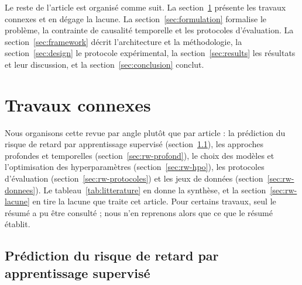 \documentclass[11pt,a4paper]{article}
\theoremstyle{definition}
\begin{document}
Le reste de l'article est organisé comme suit. La section~\ref{sec:relwork} présente les travaux connexes et en dégage la lacune. La section~\ref{sec:formulation} formalise le problème, la contrainte de causalité temporelle et les protocoles d'évaluation. La section~\ref{sec:framework} décrit l'architecture et la méthodologie, la section~\ref{sec:design} le protocole expérimental, la section~\ref{sec:results} les résultats et leur discussion, et la section~\ref{sec:conclusion} conclut.

\section{Travaux connexes}
\label{sec:relwork}

Nous organisons cette revue par angle plutôt que par article : la prédiction du risque de retard par apprentissage supervisé (section~\ref{sec:rw-supervise}), les approches profondes et temporelles (section~\ref{sec:rw-profond}), le choix des modèles et l'optimisation des hyperparamètres (section~\ref{sec:rw-hpo}), les protocoles d'évaluation (section~\ref{sec:rw-protocoles}) et les jeux de données (section~\ref{sec:rw-donnees}). Le tableau~\ref{tab:litterature} en donne la synthèse, et la section~\ref{sec:rw-lacune} en tire la lacune que traite cet article. Pour certains travaux, seul le résumé a pu être consulté \cite{rezki2024machine,widayanti2026predicting,bhuiyan2026deep,douaioui2024deep,sheridan2013time,pendlebury2019tesseract,hewamalage2023forecast} ; nous n'en reprenons alors que ce que le résumé établit.

\subsection{Prédiction du risque de retard par apprentissage supervisé}
\label{sec:rw-supervise}
\end{document}
